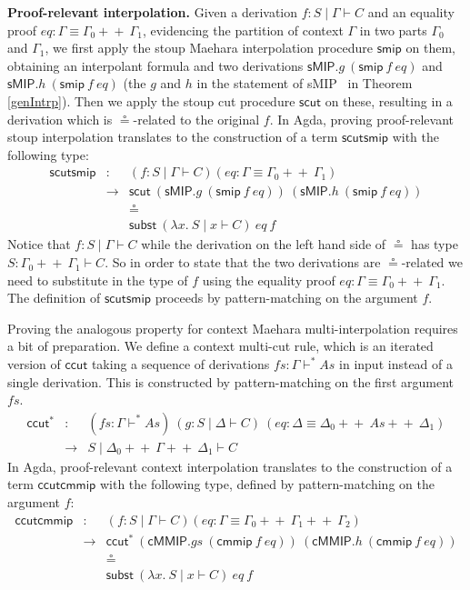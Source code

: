 \documentclass[sn-mathphys-num]{sn-jnl}%
\newcommand{\GG}{\Gamma}
\newcommand{\GD}{\Delta}
\newcommand{\vd}{\vdash}
\newcommand{\sMIP}{\textsf{sMIP}}
\newcommand{\cMMIP}{\textsf{cMMIP}}
\newcommand{\append}{+\!\!+}
\theoremstyle{thmstyleone}%
\theoremstyle{thmstyletwo}%
\theoremstyle{thmstylethree}%
\begin{document}
\noindent\textbf{Proof-relevant interpolation.}
Given a derivation $f : S \mid \GG \vdash C$ and an equality proof $eq : \GG \equiv \GG_0 \append~\GG_1$, evidencing the partition of context $\GG$ in two parts $\GG_0$ and $\GG_1$, we first apply the stoup Maehara interpolation procedure $\mathsf{smip}$ on them, obtaining an interpolant formula and two derivations $\sMIP.g ~(\mathsf{smip} ~f ~eq)$ and $\sMIP.h ~(\mathsf{smip} ~f ~eq)$ (the $g$ and $h$ in the statement of \sMIP~ in Theorem \ref{genIntrp}). Then we apply the stoup cut procedure $\mathsf{scut}$ on these, resulting in a derivation which is $\circeq$-related to the original $f$. In Agda, proving proof-relevant stoup interpolation translates to the construction of a term $\mathsf{scutsmip}$ with the following type:
\[
\begin{array}{rcl}
\mathsf{scutsmip} & : & (f : S \mid \GG \vdash C)
 (eq : \GG \equiv \GG_0 \append~\GG_1) \\
&\to &  \mathsf{scut} ~(\sMIP.g ~(\mathsf{smip} ~f ~eq)) ~(\sMIP.h ~(\mathsf{smip} ~f ~eq)) \\
&& \circeq \\
&&\mathsf{subst} ~(\lambda x.~S \mid x \vdash C) ~eq ~f
\end{array}
\]
Notice that $f : S \mid \GG \vdash C$ while the derivation on the left hand side of $\circeq$ has type $S : \GG_0 \append ~\GG_1 \vdash C$. So in order to state that the two derivations are $\circeq$-related we need to substitute in the type of $f$ using the equality proof $eq : \GG \equiv \GG_0 \append~\GG_1$.
The definition of $\mathsf{scutsmip}$ proceeds by pattern-matching on the argument $f$.

Proving the analogous property for context Maehara multi-interpolation requires a bit of preparation.
We define a context multi-cut rule, which is an iterated version of $\mathsf{ccut}$ taking a sequence of derivations $fs : \GG \vd^* As$ in input instead of a single derivation.
This is constructed by pattern-matching on the first argument $fs$.
\[
\begin{array}{rcl}
  \mathsf{ccut^*} &:& (fs : \GG \vd^* As)
  ~(g : S \mid \GD \vd C)
  ~(eq : \GD \equiv \GD_0 \append ~As \append ~\GD_1) \\
  &\to& S \mid \GD_0 \append ~\GG \append ~\GD_1 \vd C
\end{array}
\]
In Agda, proof-relevant context interpolation translates to the construction of a term $\mathsf{ccutcmmip}$ with the following type, defined by pattern-matching on the argument $f$:
\[
\begin{array}{rcl}
\mathsf{ccutcmmip} & : & (f : S \mid \GG \vdash C)
 (eq : \GG \equiv \GG_0 \append~\GG_1 \append~\GG_2) \\
&\to &  \mathsf{ccut^*} ~(\cMMIP.gs ~(\mathsf{cmmip} ~f ~eq)) ~(\cMMIP.h ~(\mathsf{cmmip} ~f ~eq)) \\
&& \circeq \\
&&\mathsf{subst} ~(\lambda x.~S \mid x \vdash C) ~eq ~f
\end{array}
\]
\end{document}
